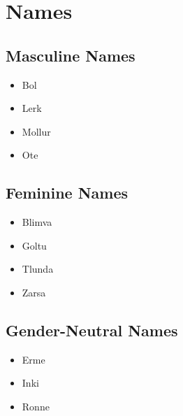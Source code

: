 
\section{Names}
\label{sec:tvk-names}

\subsection{Masculine Names}
\label{subsec:tvk-names-masc}

\begin{itemize}
	\item {} Bol 
	\item {} Lerk 
	\item {} Mollur 
	\item {} Ote 
\end{itemize}

\subsection{Feminine Names}
\label{subsec:tvk-names-femi}

\begin{itemize}
	\item {} Blimva 
	\item {} Goltu 
	\item {} Tlunda 
	\item {} Zarsa 
\end{itemize}

\subsection{Gender-Neutral Names}
\label{subsec:tvk-names-neut}

\begin{itemize}
	\item {} Erme 
	\item {} Inki 
	\item {} Ronne 
\end{itemize}


